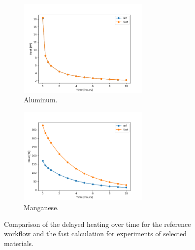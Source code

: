 \begin{figure}[htbp!] %
  \centering
  \begin{subfigure}[b]{0.49\textwidth}
    \centering
    \includegraphics[width=0.7\textwidth]{figures/fast-13_overtime}
    \caption{Aluminum.}
  \end{subfigure}
  \hfill
  \begin{subfigure}[b]{0.49\textwidth}
    \centering
    \includegraphics[width=0.7\textwidth]{figures/fast-25_overtime}
    \caption{Manganese.}
  \end{subfigure}
  \hfill
  \caption{Comparison of the delayed heating over time for the reference workflow and the fast calculation for experiments of selected materials.}
  \label{fig:time-1}
\end{figure}

